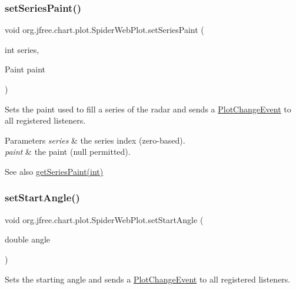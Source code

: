 \subsubsection{\texorpdfstring{set\+Series\+Paint()}{setSeriesPaint()}\hspace{0.1cm}{\footnotesize\ttfamily [2/2]}}
{\footnotesize\ttfamily void org.\+jfree.\+chart.\+plot.\+Spider\+Web\+Plot.\+set\+Series\+Paint (\begin{DoxyParamCaption}\item[{int}]{series,  }\item[{Paint}]{paint }\end{DoxyParamCaption})}

Sets the paint used to fill a series of the radar and sends a \mbox{\hyperlink{}{Plot\+Change\+Event}} to all registered listeners.


\begin{DoxyParams}{Parameters}
{\em series} & the series index (zero-\/based). \\
\hline
{\em paint} & the paint ({\ttfamily null} permitted).\\
\hline
\end{DoxyParams}
\begin{DoxySeeAlso}{See also}
\mbox{\hyperlink{classorg_1_1jfree_1_1chart_1_1plot_1_1_spider_web_plot_aaabad5cb6e0209877572a9ddd69ed4dc}{get\+Series\+Paint(int)}} 
\end{DoxySeeAlso}
\mbox{\label{classorg_1_1jfree_1_1chart_1_1plot_1_1_spider_web_plot_afbc698066d679042f63a1010a0e4f7d0}} 
\subsubsection{\texorpdfstring{set\+Start\+Angle()}{setStartAngle()}}
{\footnotesize\ttfamily void org.\+jfree.\+chart.\+plot.\+Spider\+Web\+Plot.\+set\+Start\+Angle (\begin{DoxyParamCaption}\item[{double}]{angle }\end{DoxyParamCaption})}

Sets the starting angle and sends a \mbox{\hyperlink{}{Plot\+Change\+Event}} to all registered listeners. 

